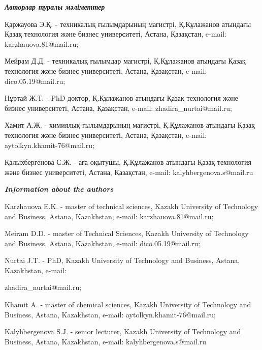 \emph{{\bfseries Авторлар туралы мәліметтер}}

\begin{noparindent}
Қаржауова Э.Қ. - техникалық ғылымдарының магистрі, Қ.Құлажанов атындағы
Қазақ технология және бизнес университеті, Астана, Қазақстан, e-mail:
karzhauova.81@mail.ru;

Мейрам Д.Д. - техникалық ғылымдар магистрі, Қ.Құлажанов атындағы Қазақ
технология және бизнес университеті, Астана, Қазақстан, e-mail:
dico.05.19@mail.ru;

Нұртай Ж.Т. - PhD доктор, Қ.Құлажанов атындағы Қазақ технология және
бизнес университеті, Астана, Қазақстан, e-mail: zhadira\_nurtai@mail.ru;

Хамит А.Ж. - химиялық ғылымдарының магистрі, Қ.Құлажанов атындағы Қазақ
технология және бизнес университеті, Астана, Қазақстан, e-mail:
aytolkyn.khamit-76@mail.ru;

Қалыхбергенова С.Ж. - аға оқытушы, Қ.Құлажанов атындағы Қазақ технология
және бизнес университеті, Астана, Қазақстан, e-mail:
kalyhbergenova.s@mail.ru
\end{noparindent}

\emph{{\bfseries Information about the authors}}

\begin{noparindent}
Karzhauova E.K. - master of technical sciences, Kazakh University of
Technology and Business, Astana, Kazakhstan, e-mail:
karzhauova.81@mail.ru;

Meiram D.D. - master of Technical Sciences, Kazakh University of
Technology and Business, Astana, Kazakhstan, e-mail: dico.05.19@mail.ru;

Nurtai J.T. - PhD, Kazakh University of Technology and Business, Astana,
Kazakhstan, e-mail:

zhadira\_nurtai@mail.ru;

Khamit A. - master of chemical sciences, Kazakh University of Technology
and Business, Astana, Kazakhstan, e-mail: aytolkyn.khamit-76@mail.ru;

Kalyhbergenova S.J. - senior lecturer, Kazakh University of Technology
and Business, Astana, Kazakhstan, e-mail: kalyhbergenova.s@mail.ru
\end{noparindent}

